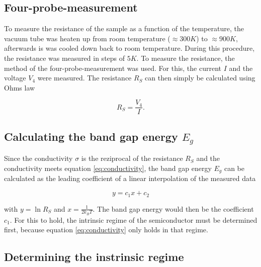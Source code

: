 \documentclass[a4paper]{article}
\begin{document}
\subsection{Four-probe-measurement}

To measure the resistance of the sample as a function of the temperature, the vacuum tube was heaten up from room temperature ($\approx 300 K$) to $\approx 900 K$, afterwards is was cooled down back to room temperature. During this procedure, the resistance was measured in steps of $5 K$. To measure the resistance, the method of the four-probe-measurement was used.
\newline
For this, the current $I$ and the voltage $V_4$ were measured. The resistance $R_S$ can then simply be calculated using Ohms law

\begin{equation}
R_S = \frac{V_4}{I}.
\end{equation}

\subsection{Calculating the band gap energy $E_g$}

Since the conductivity $\sigma$ is the reziprocal of the resistance $R_S$ and the conductivity meets equation \eqref{eq:conductivity}, the band gap energy $E_g$ can be calculated as the leading coefficient of a linear interpolation of the measured data

\begin{equation}
y = c_1 x + c_2
\end{equation}

with $y = \ln{R_S}$ and $x = \frac{1}{2 k_B T}$. The band gap energy would then be the coefficient $c_1$. For this to hold, the intrinsic regime of the semiconductor must be determined first, because equation \eqref{eq:conductivity} only holds in that regime.

\subsection{Determining the instrinsic regime}
\label{sec:intrinsicRegime}
\end{document}

